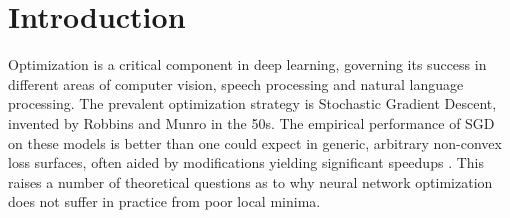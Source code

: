 \section{Introduction}
\label{sec:Intro}

%


Optimization is a critical component in deep learning, governing its success in different areas of computer vision, speech processing and natural language processing. The prevalent optimization strategy is Stochastic Gradient Descent, invented by Robbins and Munro in the 50s. The empirical performance of SGD on these models is better than one could expect in generic, arbitrary non-convex loss surfaces, often aided by modifications yielding significant speedups \cite{duchi2011adaptive, hinton2012lecture, ioffe2015batch, kingma2014adam}. This raises a number of theoretical questions as to why neural network optimization does not suffer in practice from poor local minima. 

